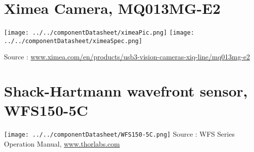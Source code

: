 \section{Ximea Camera, MQ013MG-E2}
\label{app:ximeaCam}
\begin{center}
\texttt{[image: ../../componentDatasheet/ximeaPic.png]}
\texttt{[image: ../../componentDatasheet/ximeaSpec.png]}
\end{center}
Source : \url{www.ximea.com/en/products/usb3-vision-cameras-xiq-line/mq013mg-e2}

\section{Shack-Hartmann wavefront sensor, WFS150-5C}
\label{app:SHwfs}
\texttt{[image: ../../componentDatasheet/WFS150-5C.png]}
Source : WFS Series Operation Manual, \url{www.thorlabs.com}